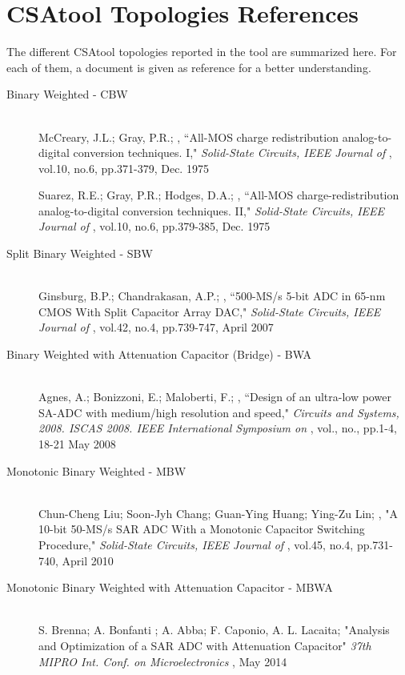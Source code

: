 \label{topologies}

\section{CSAtool Topologies References}
The different CSAtool topologies reported in the tool are summarized here. For each of them, a document is given as reference for a better understanding.

\begin{flushleft} 
\begin{description}
	\item[Binary Weighted - CBW] \hfill \\
{ \footnotesize McCreary, J.L.; Gray, P.R.; , ``All-MOS charge redistribution analog-to-digital conversion techniques. I," \emph{Solid-State Circuits, IEEE Journal of} , vol.10, no.6, pp.371-379, Dec. 1975}

{ \footnotesize Suarez, R.E.; Gray, P.R.; Hodges, D.A.; , ``All-MOS charge-redistribution analog-to-digital conversion techniques. II," \emph{Solid-State Circuits, IEEE Journal of} , vol.10, no.6, pp.379-385, Dec. 1975}

	\item[Split Binary Weighted - SBW] \hfill \\
{ \footnotesize Ginsburg, B.P.; Chandrakasan, A.P.; , ``500-MS/s 5-bit ADC in 65-nm CMOS With Split Capacitor Array DAC," \emph{Solid-State Circuits, IEEE Journal of} , vol.42, no.4, pp.739-747, April 2007}

	\item[Binary Weighted with Attenuation Capacitor (Bridge) - BWA] \hfill \\
{ \footnotesize Agnes, A.; Bonizzoni, E.; Maloberti, F.; , ``Design of an ultra-low power SA-ADC with medium/high resolution and speed," \emph{Circuits and Systems, 2008. ISCAS 2008. IEEE International Symposium on} , vol., no., pp.1-4, 18-21 May 2008}

\item[Monotonic Binary Weighted - MBW] \hfill \\
{ \footnotesize Chun-Cheng Liu; Soon-Jyh Chang; Guan-Ying Huang; Ying-Zu Lin; , "A 10-bit 50-MS/s SAR ADC With a Monotonic Capacitor Switching Procedure," \emph{Solid-State Circuits, IEEE Journal of} , vol.45, no.4, pp.731-740, April 2010}

\item[Monotonic Binary Weighted with Attenuation Capacitor - MBWA] \hfill \\
{ \footnotesize S. Brenna; A. Bonfanti ; A. Abba; F. Caponio, A. L. Lacaita;  "Analysis and Optimization of a SAR ADC with Attenuation Capacitor" \emph{37th MIPRO Int. Conf. on Microelectronics} , May 2014}




\end{description}
\end{flushleft}
